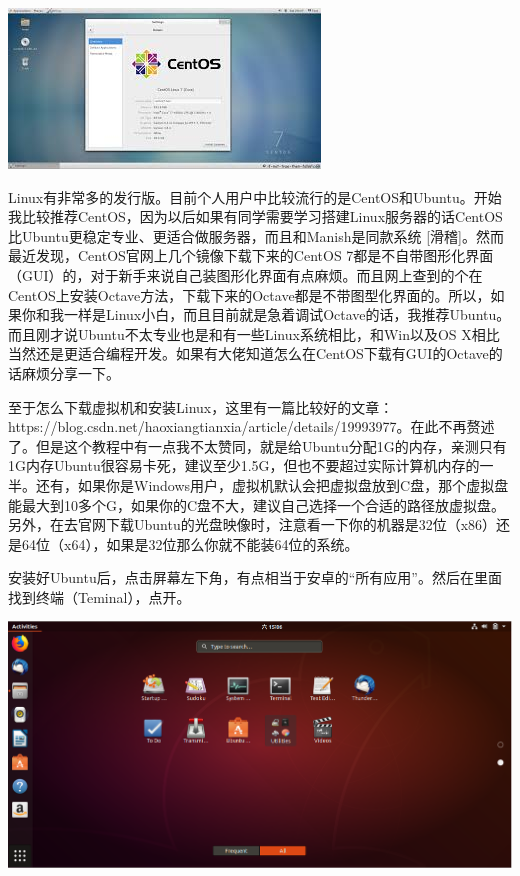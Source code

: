 \documentclass[12pt]{article}
\begin{document}
\begin{spacing}{1.4}
\includegraphics{centos.jpg}

Linux有非常多的发行版。目前个人用户中比较流行的是CentOS和Ubuntu。开始我比较推荐CentOS，因为以后如果有同学需要学习搭建Linux服务器的话CentOS比Ubuntu更稳定专业、更适合做服务器，而且和Manish是同款系统 [滑稽]。然而最近发现，CentOS官网上几个镜像下载下来的CentOS 7都是不自带图形化界面（GUI）的，对于新手来说自己装图形化界面有点麻烦。而且网上查到的个在CentOS上安装Octave方法，下载下来的Octave都是不带图型化界面的。所以，如果你和我一样是Linux小白，而且目前就是急着调试Octave的话，我推荐Ubuntu。而且刚才说Ubuntu不太专业也是和有一些Linux系统相比，和Win以及OS X相比当然还是更适合编程开发。如果有大佬知道怎么在CentOS下载有GUI的Octave的话麻烦分享一下。

至于怎么下载虚拟机和安装Linux，这里有一篇比较好的文章：https://blog.csdn.net/haoxiangtianxia/article/details/19993977。在此不再赘述了。但是这个教程中有一点我不太赞同，就是给Ubuntu分配1G的内存，亲测只有1G内存Ubuntu很容易卡死，建议至少1.5G，但也不要超过实际计算机内存的一半。还有，如果你是Windows用户，虚拟机默认会把虚拟盘放到C盘，那个虚拟盘能最大到10多个G，如果你的C盘不大，建议自己选择一个合适的路径放虚拟盘。另外，在去官网下载Ubuntu的光盘映像时，注意看一下你的机器是32位（x86）还是64位（x64），如果是32位那么你就不能装64位的系统。

安装好Ubuntu后，点击屏幕左下角，有点相当于安卓的“所有应用”。然后在里面找到终端（Teminal），点开。

\includegraphics[width=\linewidth]{ubuntu1.png}


\end{spacing}
\end{document}
